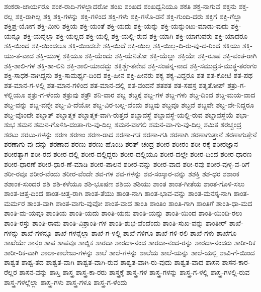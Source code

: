 ಶಂಕರಾ-ಚಾರ್ಯರೂ
ಶಂಕ-ರಾದಿ-ಗಳಲ್ಲಾದರೋ
ಶಂಖ
ಶಂಖದ
ಶಂಖಧ್ವನಿಯೂ
ಶಕತಿ
ಶಕ್ತ-ನಾಗುವೆ
ಶಕ್ತನು
ಶಕ್ತ-ರಲ್ಲ
ಶಕ್ತ-ರಾಗಿಲ್ಲ
ಶಕ್ತಿ
ಶಕ್ತಿ-ಗಳನ್ನು
ಶಕ್ತಿ-ಗಳಿಂದ
ಶಕ್ತಿ-ಗಳು
ಶಕ್ತಿ-ಗಳೊ-ಡನೆ
ಶಕ್ತಿ-ಗುಂದಿ-ದರು
ಶಕ್ತಿಗೆ
ಶಕ್ತಿ-ಗೆಲ್ಲಾ
ಶಕ್ತಿಪ್ರ-ಯೋಗ
ಶಕ್ತಿ-ಮೀರಿ
ಶಕ್ತಿಯ
ಶಕ್ತಿ-ಯಂತೆ
ಶಕ್ತಿ-ಯದು
ಶಕ್ತಿ-ಯನ್ನು
ಶಕ್ತಿ-ಯನ್ನುಂಟು-ಮಾಡು-ವುದು
ಶಕ್ತಿ-ಯನ್ನೂ
ಶಕ್ತಿ-ಯನ್ನೆಲ್ಲಾ
ಶಕ್ತಿ-ಯಲ್ಲದ
ಶಕ್ತಿ-ಯಲ್ಲಿ
ಶಕ್ತಿ-ಯಲ್ಲಿ-ರುವ
ಶಕ್ತಿ-ಯಾಗಿ
ಶಕ್ತಿ-ಯಾಗುವರು
ಶಕ್ತಿ-ಯಾದರೂ
ಶಕ್ತಿ-ಯಿಂದ
ಶಕ್ತಿ-ಯಿಂದಲೂ
ಶಕ್ತಿ-ಯಿಂದಲೇ
ಶಕ್ತಿ-ಯಿದೆ
ಶಕ್ತಿ-ಯಿಲ್ಲ
ಶಕ್ತಿ-ಯಿಲ್ಲ-ದಿ-ರು-ವು-ದ-ರಿಂದ
ಶಕ್ತಿಯು
ಶಕ್ತಿ-ಯು-ತ-ವಾದ
ಶಕ್ತಿ-ಯುಳ್ಳ
ಶಕ್ತಿಯೂ
ಶಕ್ತಿ-ಯೆಂದು
ಶಕ್ತಿ-ಯೆನಿತೋ
ಶಕ್ತಿ-ಯೆಲ್ಲಾ
ಶಕ್ತಿಯೇ
ಶಕ್ತಿ-ರೂಪ
ಶಕ್ತಿ-ವಂತ-ರಾಗಿ
ಶಕ್ತಿ-ಶಾಲಿ-ಗಳ
ಶಕ್ತಿ-ಶಾ-ಲಿನಿ
ಶಕ್ತಿ-ಶಾಲಿ-ಯಾದದ್ದು
ಶಕ್ತಿಶ್ಚೇ-ತನೇವ
ಶಕ್ತಿ-ಸಂಪನ್ನ-ನಾದ
ಶಕ್ತಿ-ಸಮುದ್ರಸ-ಮುತ್ಥ-ತರಂಗಂ
ಶಕ್ತಿ-ಸಾಧಕ-ನಾಗಿದ್ದನು
ಶಕ್ತಿ-ಸಾಮರ್ಥ್ಯ-ದಿಂದ
ಶಕ್ತಿ-ಹೀನ
ಶಕ್ತಿ-ಹೀನರು
ಶಕ್ಯ
ಶಕ್ಯ-ವಿದ್ದರೂ
ಶತ
ಶತ-ಕೋಟಿ
ಶತ-ಪಥ
ಶತ-ಮಾನ-ಗ-ಳಲ್ಲಿ
ಶತ-ಮಾನ-ಗಳಿಂದ
ಶತ-ಮಾನ-ದಲ್ಲಿ
ಶತ-ವಂದನೆ
ಶತಶತ
ಶತ-ಸಹಸ್ರ
ಶತೃತೋಪ್
ಶತ್ರು-ಗ-ಳಲ್ಲಿಯೂ
ಶತ್ರು-ಗ-ಳೆಂದು
ಶತ್ರುವು
ಶತ್ರೌ
ಶನಿ-ವಾರ
ಶಬ್ದ
ಶಬ್ದಕ್ಕೆ
ಶಬ್ದ-ಗಳ
ಶಬ್ದ-ಗಳು
ಶಬ್ದ-ದಿಂದ
ಶಬ್ದ-ಮಯ-ವಾದ
ಶಬ್ದ-ವನ್ನು
ಶಬ್ದ-ವನ್ನೇ
ಶಬ್ದ-ವಿ-ದೆಯೋ
ಶಬ್ದ-ವಿರ-ಬಲ್ಲ-ವೆಂದು
ಶಬ್ದವು
ಶಬ್ದವೂ
ಶಬ್ದವೆ
ಶಬ್ದವೇ
ಶಬ್ದ-ವೇ-ನಿದ್ದರೂ
ಶಬ್ದ-ವೊಂದೇ
ಶಬ್ದಾತ್
ಶಬ್ದಾತ್ಮಕ
ಶಬ್ದಾತ್ಮಕ-ವಾಗಿ-ರುತ್ತದೆ
ಶಬ್ದಾವಸ್ಥೆ
ಶಬ್ದಾವಸ್ಥೆ-ಯಲ್ಲಿ-ರುವ
ಶಬ್ದಾವಸ್ಥೆಯೆ
ಶಭಾ-ಶುಭ
ಶಮನ
ಶಮನ-ಗೊಳಿಸಿ-ದಂತಾ-ಗು-ವು-ದಿಲ್ಲ
ಶಮನ-ವಾಗಲಿ
ಶಮನ-ವಾ-ಗು-ವು-ದಿಲ್ಲ
ಶಮಿತ
ಶರಚ್ಚಂದ್ರ
ಶರಟು
ಶರಟು-ಗಳನ್ನು
ಶರಣ
ಶರಣಂ
ಶರಣ-ರಾದ
ಶರಣಾ-ಗತ
ಶರಣಾ-ಗತಿ
ಶರಣಾಗಿ
ಶರಣಾಗುತ್ತಾನೆ
ಶರಣಾಗುತ್ತೇನೆ
ಶರಣಾಗು-ವು-ದನ್ನು
ಶರಣಾದ
ಶರಣು
ಶರಣು-ಹೊಂದಿ
ಶರತ್‌-ಚಂದ್ರ
ಶರೀರ
ಶರೀರಂ
ಶರೀ-ರಕ್ಕೆ
ಶರೀರಜ್ಞಾನ
ಶರೀರತ್ಯಾಗ
ಶರೀ-ರದ
ಶರೀರ-ದಲ್ಲಿ
ಶರೀರ-ದಲ್ಲಿದ್ದರು
ಶರೀರ-ದಲ್ಲಿಯೂ
ಶರೀರ-ದಲ್ಲೇ
ಶರೀರ-ದಿಂದ
ಶರೀರ-ಧಾರಣ
ಶರೀರ-ಧಾರಣೆ
ಶರೀರ-ಧಾರ-ಣೆ-ಮಾಡಿ
ಶರೀರ-ಪಾಲನ
ಶರೀರ-ವನ್ನು
ಶರೀರ-ವಾದ
ಶರೀ-ರವು
ಶರೀರ-ವುಳ್ಳ-ವ-ರಿಗೆ
ಶರೀ-ರವೂ
ಶರೀರ-ವೆಂದು
ಶರೀರ-ವೆಂದೇ
ಶವ-ಗಳ
ಶವ-ಗಳನ್ನು
ಶವ-ಸಂಸ್ಕಾರ-ವನ್ನು
ಶಶಕ್ತಿ
ಶಶ-ಧರ
ಶಶಾಂಕ
ಶಶಾಂಕ-ಸುಂದರ
ಶಶಿ
ಶಶಿ-ಕಳೆಯೂ
ಶಶಿ-ಭೂಷಣ
ಶಶಿಯ
ಶಶಿಯು
ಶಾಂತ
ಶಾಂತ-ಗೀತೆಯ
ಶಾಂತ-ಗೊಳಿ-ಸಲು
ಶಾಂತ-ಚಿತ್ತ-ದಿಂದ
ಶಾಂತ-ಚಿತ್ತ-ರಾಗಿ
ಶಾಂತ-ತೆಯು
ಶಾಂತ-ನಾಗಿ
ಶಾಂತ-ಭಾವ-ವನ್ನು
ಶಾಂತ-ಮನಸ್ಕ-ನಾಗಿ
ಶಾಂತ-ಮರ್ಮರ
ಶಾಂತ-ವಾಗಿ
ಶಾಂತ-ವಾಗು-ವುವೋ
ಶಾಂತ-ವಾದ
ಶಾಂತಿ
ಶಾಂತಿಂ
ಶಾಂತಿ-ಗಾಗಿ
ಶಾಂತಿಗೆ
ಶಾಂತಿ-ಧಾ-ಮದ
ಶಾಂತಿ-ಮ-ಯವೂ
ಶಾಂತಿಯ
ಶಾಂತಿ-ಯದು
ಶಾಂತಿ-ಯನು
ಶಾಂತಿ-ಯನ್ನು
ಶಾಂತಿ-ಯಿಂದ
ಶಾಂತಿ-ಯಿಂದಿ-ರಲು
ಶಾಂತಿ-ರಸ್ತು
ಶಾಂತಿ-ರಾಮ
ಶಾಂತಿ-ವಿಶ್ರಾಂತಿ-ಗಳ
ಶಾಂತಿ-ಶುಭ-ವೆಂದೆಂದು
ಶಾಂತಿ-ಸುಖ-ವನ್ನು
ಶಾಂತೀರ್
ಶಾಖೆ-ಗಳನ್ನು
ಶಾಖೆ-ಗಳನ್ನೂ
ಶಾಖೆ-ಗಳನ್ನೆಲ್ಲಾ
ಶಾಖೆ-ಗ-ಳಲ್ಲಿ
ಶಾಖೆ-ಗಳಿಗೂ
ಶಾಖೆ-ಗಳಿ-ರಲಿ
ಶಾಖೆ-ಗಳು
ಶಾಖೆಗೂ
ಶಾಖೆಯೇ
ಶಾನ್ತಂ
ಶಾಪ
ಶಾಪವೂ
ಶಾಬ್ದಿಕ
ಶಾರದಾ
ಶಾರದಾ-ನಂದ
ಶಾರದಾ-ನಂದ-ರನ್ನು
ಶಾರದಾ-ನಂದರು
ಶಾರೀ-ರಿಕ
ಶಾರೀ-ರಿಕ-ವಾಗಿ
ಶಾಲಾ-ಕಾಲೇಜು-ಗಳನ್ನು
ಶಾಲೆ
ಶಾಲೆ-ಗಳನ್ನು
ಶಾಲೆಯ
ಶಾಲೆ-ಯನ್ನು
ಶಾಲೆ-ಯಲ್ಲಿ
ಶಾವಿ-ಗೆ-ಯಿಂದ
ಶಾಶ್ವತ
ಶಾಶ್ವ-ತದ
ಶಾಶ್ವತ-ವಾಗಿ
ಶಾಶ್ವತ-ವಾಗಿ-ರುವ
ಶಾಶ್ವತ-ವಾಗಿ-ರು-ವುದು
ಶಾಶ್ವತ-ವಾದ
ಶಾಸನ
ಶಾಸನ-ಕಾರ-ರೆಲ್ಲರ
ಶಾಸನ-ವನ್ನು
ಶಾಸ್ತಿ
ಶಾಸ್ತ್ರ
ಶಾಸ್ತ್ರ-ಕಾ-ರರು
ಶಾಸ್ತ್ರಕ್ಕೆ
ಶಾಸ್ತ್ರ-ಗಳ
ಶಾಸ್ತ್ರ-ಗಳನ್ನು
ಶಾಸ್ತ್ರ-ಗ-ಳಲ್ಲಿ
ಶಾಸ್ತ್ರ-ಗಳಲ್ಲಿ-ರುವ
ಶಾಸ್ತ್ರ-ಗಳಲ್ಲೆಲ್ಲಾ
ಶಾಸ್ತ್ರ-ಗಳು
ಶಾಸ್ತ್ರ-ಗಳೂ
ಶಾಸ್ತ್ರ-ಗ-ಳೆಂದು
